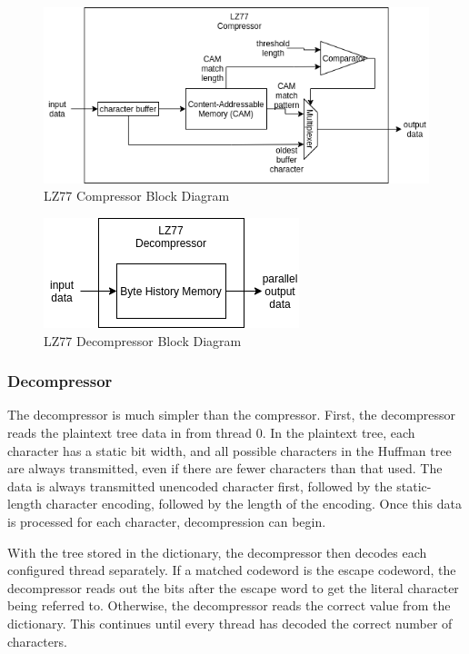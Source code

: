 \documentclass[doublespace,nopageskip]{VTthesis}
\begin{document}
\begin{figure}[htb]
	\centering
	\includegraphics[scale=0.8]{LZ77 Compressor.png}
	\caption{LZ77 Compressor Block Diagram}
	\label{fig:lz77_compressor_block_diagram}
\end{figure}

\begin{figure}[htb]
	\centering
	\includegraphics[scale=1]{LZ77 Decompressor.png}
	\caption{LZ77 Decompressor Block Diagram}
	\label{fig:lz77_decompressor_block_diagram}
\end{figure}

\subsubsection{Decompressor}\label{sss:decompressor}
The decompressor is much simpler than the compressor. First, the decompressor reads the plaintext tree data in from thread 0. In the plaintext tree, each character has a static bit width, and all possible characters in the Huffman tree are always transmitted, even if there are fewer characters than that used. The data is always transmitted unencoded character first, followed by the static-length character encoding, followed by the length of the encoding. Once this data is processed for each character, decompression can begin.

With the tree stored in the dictionary, the decompressor then decodes each configured thread separately. If a matched codeword is the escape codeword, the decompressor reads out the bits after the escape word to get the literal character being referred to. Otherwise, the decompressor reads the correct value from the dictionary. This continues until every thread has decoded the correct number of characters.
\end{document}
